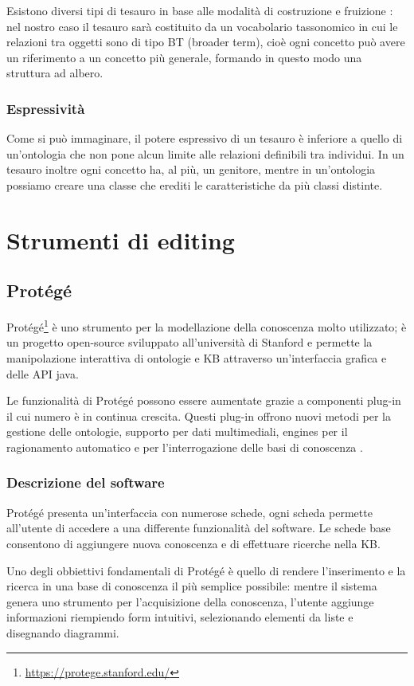 Esistono diversi tipi di tesauro in base alle modalità di costruzione e fruizione \cite{kilgarriff2000s}: nel nostro caso il tesauro sarà costituito da un vocabolario tassonomico in cui le relazioni tra oggetti sono di tipo BT (broader term), cioè ogni concetto può avere un riferimento a un concetto più generale, formando in questo modo una struttura ad albero. 
\subsubsection{Espressività}
Come si può immaginare, il potere espressivo di un tesauro è inferiore a quello di un'ontologia che non pone alcun limite alle relazioni definibili tra individui. In un tesauro inoltre ogni concetto ha, al più, un genitore, mentre in un'ontologia possiamo creare una classe che erediti le caratteristiche da più classi distinte.
\section{Strumenti di editing}

\subsection{Protégé}
Protégé\footnote{\url{https://protege.stanford.edu/}} è uno strumento per la modellazione della conoscenza molto utilizzato; è un progetto open-source sviluppato all'università di Stanford e permette la manipolazione interattiva di ontologie e KB attraverso un'interfaccia grafica e delle API java.

Le funzionalità di Protégé possono essere aumentate grazie a componenti plug-in il cui numero è in continua crescita. Questi plug-in offrono nuovi metodi per la gestione delle ontologie, supporto per dati multimediali, engines per il ragionamento automatico e per l'interrogazione delle basi di conoscenza \cite{sivakumar2011ontology}.
\subsubsection{Descrizione del software}
Protégé presenta un'interfaccia con numerose schede, ogni scheda permette all'utente di accedere a una differente funzionalità del software. Le schede base consentono di aggiungere nuova conoscenza e di effettuare ricerche nella KB.

Uno degli obbiettivi fondamentali di Protégé è quello di rendere l'inserimento e la ricerca in una base di conoscenza il più semplice possibile: mentre il sistema genera uno strumento per l'acquisizione della conoscenza, l'utente aggiunge informazioni riempiendo form intuitivi, selezionando elementi da liste e disegnando diagrammi.

